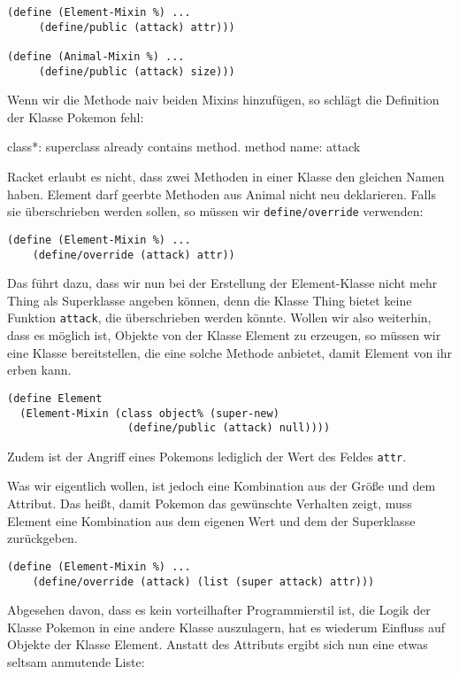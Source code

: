 \begin{lstlisting}
(define (Element-Mixin %) ...
     (define/public (attack) attr)))

(define (Animal-Mixin %) ...
     (define/public (attack) size)))
\end{lstlisting}

Wenn wir die Methode naiv beiden Mixins hinzufügen, so schlägt die Definition der Klasse Pokemon fehl:

{\rerror class*: superclass already contains method. method name: attack}

Racket erlaubt es nicht, dass zwei Methoden in einer Klasse den gleichen Namen haben. Element darf geerbte Methoden aus Animal nicht neu deklarieren. Falls sie überschrieben werden sollen, so müssen wir \texttt{define/override} verwenden:

\begin{lstlisting}
(define (Element-Mixin %) ...
    (define/override (attack) attr))
\end{lstlisting}

Das führt dazu, dass wir nun bei der Erstellung der Element-Klasse nicht mehr Thing als Superklasse angeben können, denn die Klasse Thing bietet keine Funktion \texttt{attack}, die überschrieben werden könnte. Wollen wir also weiterhin, dass es möglich ist, Objekte von der Klasse Element zu erzeugen, so müssen wir eine Klasse bereitstellen, die eine solche Methode anbietet, damit Element von ihr erben kann.

\begin{lstlisting}
(define Element 
  (Element-Mixin (class object% (super-new)
                   (define/public (attack) null))))
\end{lstlisting}

Zudem ist der Angriff eines Pokemons lediglich der Wert des Feldes \texttt{attr}. 

Was wir eigentlich wollen, ist jedoch eine Kombination aus der Größe und dem Attribut. Das heißt, damit Pokemon das gewünschte Verhalten zeigt, muss Element eine Kombination aus dem eigenen Wert und dem der Superklasse zurückgeben.

\begin{lstlisting}
(define (Element-Mixin %) ...
    (define/override (attack) (list (super attack) attr)))
\end{lstlisting}

Abgesehen davon, dass es kein vorteilhafter Programmierstil ist, die Logik der Klasse Pokemon in eine andere Klasse auszulagern, hat es wiederum Einfluss auf Objekte der Klasse Element. Anstatt des Attributs ergibt sich nun eine etwas seltsam anmutende Liste:

